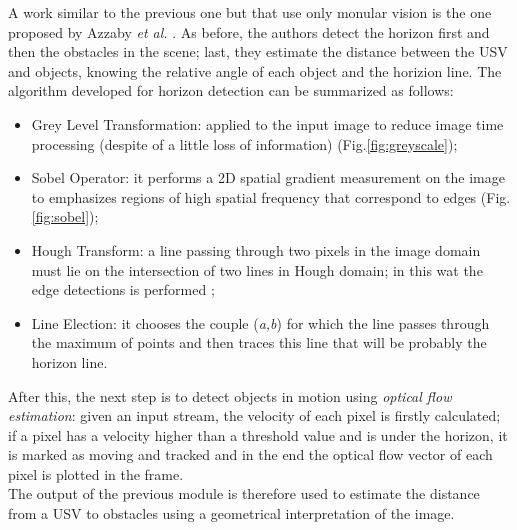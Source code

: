 \documentclass[12pt]{article}
\begin{document}
      \indent A work similar to the previous one but that use only monular vision is the one proposed by Azzaby \textit{et al.} \parencite{Azzabi}. As before, the authors detect the horizon first and then the obstacles in the scene; last, they estimate the distance between the USV and objects, knowing the relative angle of each object and the horizion line. The algorithm developed for horizon detection can be summarized as follows:
            \begin{itemize}
                  \item Grey Level Transformation: applied to the input image to reduce image time processing (despite of a little loss of information) (Fig.\ref{fig:greyscale});
                  \item Sobel Operator: it performs a 2D spatial gradient measurement on the image to emphasizes regions of high spatial frequency that correspond to edges \parencite{Maini2009} (Fig.\ref{fig:sobel});
                  \item Hough Transform: a line passing through two pixels in the image domain must lie on the intersection of two lines in Hough domain; in this wat the edge detections is performed \parencite{Hough_1962};
                  \item Line Election: it chooses the couple (\textit{a,b}) for which the line passes through the maximum of points and then traces this line that will be probably the horizon line.
            \end{itemize}
      \indent After this, the next step is to detect objects in motion using \textit{optical flow estimation}: given an input stream, the velocity of each pixel is firstly calculated; if a pixel has a velocity higher than a threshold value and is under the horizon, it is marked as moving and tracked and in the end the optical flow vector of each pixel is plotted in the frame.\\
      \indent The output of the previous module is therefore used to estimate the distance from a USV to obstacles using a geometrical interpretation of the image.
\end{document}
